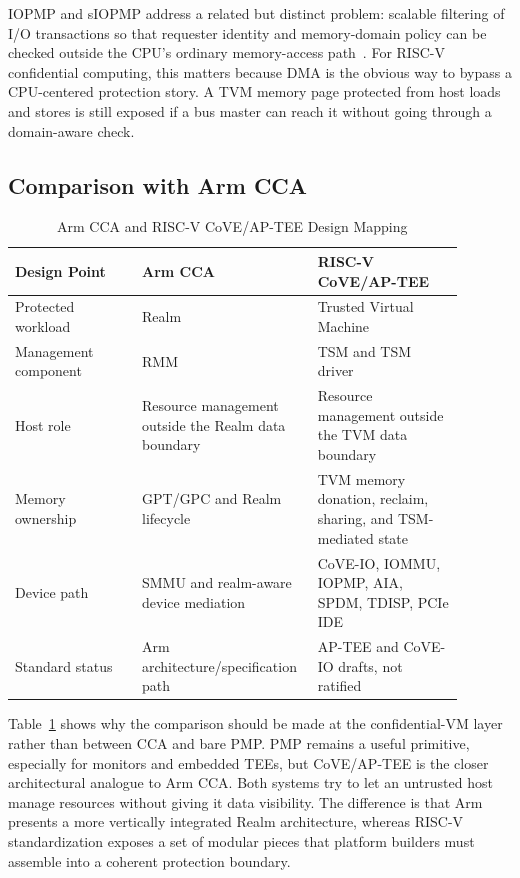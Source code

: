 IOPMP and sIOPMP address a related but distinct problem: scalable filtering of
I/O transactions so that requester identity and memory-domain policy can be
checked outside the CPU's ordinary memory-access path~\cite{riscv_iopmp_2026,feng2024siopmp}.
For RISC-V confidential computing, this matters because DMA is the obvious way
to bypass a CPU-centered protection story. A TVM memory page protected from host
loads and stores is still exposed if a bus master can reach it without going
through a domain-aware check.

\subsection{Comparison with Arm CCA}

\begin{table}[htbp]
\centering
\caption{Arm CCA and RISC-V CoVE/AP-TEE Design Mapping}
\label{tab:arm_cca_riscv_cove}
\begin{tabular}{@{}p{0.27\linewidth}p{0.31\linewidth}p{0.31\linewidth}@{}}
\toprule
\textbf{Design Point} & \textbf{Arm CCA} & \textbf{RISC-V CoVE/AP-TEE} \\ \midrule
Protected workload & Realm & Trusted Virtual Machine \\
Management component & RMM & TSM and TSM driver \\
Host role & Resource management outside the Realm data boundary & Resource management outside the TVM data boundary \\
Memory ownership & GPT/GPC and Realm lifecycle & TVM memory donation, reclaim, sharing, and TSM-mediated state \\
Device path & SMMU and realm-aware device mediation & CoVE-IO, IOMMU, IOPMP, AIA, SPDM, TDISP, PCIe IDE \\
Standard status & Arm architecture/specification path & AP-TEE and CoVE-IO drafts, not ratified \\ \bottomrule
\end{tabular}
\end{table}

Table~\ref{tab:arm_cca_riscv_cove} shows why the comparison should be made at
the confidential-VM layer rather than between CCA and bare PMP. PMP remains a
useful primitive, especially for monitors and embedded TEEs, but CoVE/AP-TEE is
the closer architectural analogue to Arm CCA. Both systems try to let an
untrusted host manage resources without giving it data visibility. The
difference is that Arm presents a more vertically integrated Realm architecture,
whereas RISC-V standardization exposes a set of modular pieces that platform
builders must assemble into a coherent protection boundary.

